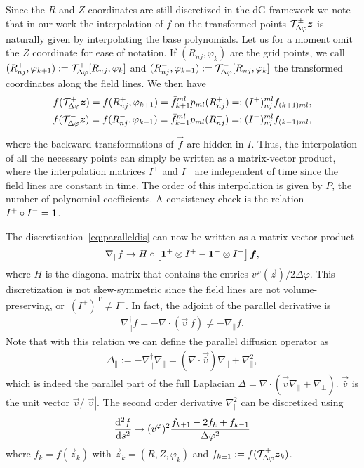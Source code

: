 Since the $R$ and $Z$ coordinates are still discretized in the dG framework we note that in our work
the interpolation of $f$ on the transformed points $\mathcal T^\pm_{\Delta\varphi}{\boldsymbol{z}}$
is naturally given by interpolating the base polynomials.
Let us for a moment omit the $Z$ coordinate for ease of notation.
If $(R_{nj}, \varphi_k)$ are the grid points,
we call $(R^+_{nj}, \varphi_{k+1}) := \mathcal T^+_{\Delta\varphi}[R_{nj}, \varphi_k]$ and
$(R_{nj}^-, \varphi_{k-1}) := \mathcal T^-_{\Delta\varphi}[R_{nj}, \varphi_k]$ the transformed coordinates along
the field lines. We then have
\begin{subequations}
\begin{align}
    f(\mathcal T^+_{\Delta\varphi}{\boldsymbol{z}}) = f( R^+_{nj}, \varphi_{k+1}) = \bar f_{k+1}^{ml}p_{ml}(R^+_{nj}) =: (I^+)_{nj}^{ml}f_{(k+1)ml} , \\
    f(\mathcal T^-_{\Delta\varphi}{\boldsymbol{z}}) = f( R^-_{nj}, \varphi_{k-1}) = \bar f_{k-1}^{ml}p_{ml}(R^-_{nj}) =: (I^-)_{nj}^{ml}f_{(k-1)ml} , 
\end{align}
\label{eq:interpolation}
\end{subequations}
where the backward transformations of $\bar{ \vec f}$ are hidden in $I$.
Thus, the interpolation of all the necessary points can simply be written as a matrix-vector product, where the interpolation matrices $I^+$  and $I^-$ are independent of time since
the field lines are constant in time. The order of this interpolation is given by $P$, the number of polynomial coefficients.
A consistency check is the relation $I^+\circ I^- = \mathbf{1}$.

The discretization~\eqref{eq:paralleldis} can now be written as a matrix vector product
\begin{align}
    \nabla_\parallel f \rightarrow H \circ \left[ \mathbf{1}^+\otimes I^+ - \mathbf{1}^- \otimes I^-  \right] {\boldsymbol{f}}, 
    \label{}
\end{align}
where $H$ is the diagonal matrix that contains the entries $v^\varphi(\vec z)/2\Delta\varphi$.
This discretization is not skew-symmetric since the
field lines are not volume-preserving, or~$(I^+)^\mathrm{T} \neq I^-$.
In fact, the adjoint of the parallel derivative is
\begin{align}
    \nabla_\parallel^\dagger f = - \nabla\cdot(\vec v\ f ) \neq -\nabla_\parallel f.
    \label{}
\end{align}
Note that with this relation we can define the parallel
diffusion operator as
\begin{align}
    \Delta_\parallel := -\nabla_\parallel^\dagger \nabla_\parallel = (\nabla\cdot \vec{ \hat v}) \nabla_\parallel + \nabla_\parallel^2 , 
    \label{}
\end{align}
which is indeed the parallel part of the full Laplacian $\Delta = \nabla\cdot( \vec{ \hat v} \nabla_\parallel + \nabla_\perp)$.
$\vec{ \hat v} $ is the unit vector $\vec v/ |\vec v|$.
The second order derivative $\nabla_\parallel^2$ can be
discretized using
\begin{align}
    \frac{\mathrm{d}^2 f}{\mathrm{d} s^2} \rightarrow
    (v^\varphi)^2 \frac{f_{k+1} - 2f_k + f_{k-1} }{\Delta\varphi^2}
    \label{}
\end{align}
where $f_k = f(\vec z_k)$ with $\vec z_k = (R,Z,\varphi_k)$ and $f_{k\pm 1} := f(\mathcal T^\pm_{\Delta\varphi} {\boldsymbol{z}}_k)$.
